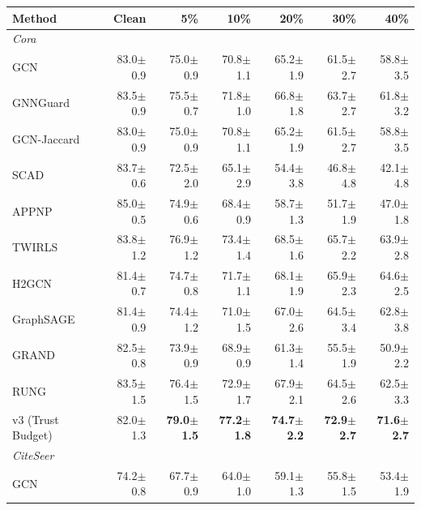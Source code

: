\documentclass{article}
\newcommand{\score}[2]{#1{\scriptsize$\pm$#2}}
\begin{document}
\begin{center}\scriptsize\begin{tabular}{lrrrrrr}
\toprule
Method & Clean & 5\% & 10\% & 20\% & 30\% & 40\% \\
\midrule
\multicolumn{7}{l}{\textit{Cora}} \\
\midrule
GCN            & \score{83.0}{0.9} & \score{75.0}{0.9} & \score{70.8}{1.1} & \score{65.2}{1.9} & \score{61.5}{2.7} & \score{58.8}{3.5} \\
GNNGuard       & \score{83.5}{0.9} & \score{75.5}{0.7} & \score{71.8}{1.0} & \score{66.8}{1.8} & \score{63.7}{2.7} & \score{61.8}{3.2} \\
GCN-Jaccard    & \score{83.0}{0.9} & \score{75.0}{0.9} & \score{70.8}{1.1} & \score{65.2}{1.9} & \score{61.5}{2.7} & \score{58.8}{3.5} \\
SCAD           & \score{83.7}{0.6} & \score{72.5}{2.0} & \score{65.1}{2.9} & \score{54.4}{3.8} & \score{46.8}{4.8} & \score{42.1}{4.8} \\
APPNP          & \score{85.0}{0.5} & \score{74.9}{0.6} & \score{68.4}{0.9} & \score{58.7}{1.3} & \score{51.7}{1.9} & \score{47.0}{1.8} \\
TWIRLS         & \score{83.8}{1.2} & \score{76.9}{1.2} & \score{73.4}{1.4} & \score{68.5}{1.6} & \score{65.7}{2.2} & \score{63.9}{2.8} \\
H2GCN          & \score{81.4}{0.7} & \score{74.7}{0.8} & \score{71.7}{1.1} & \score{68.1}{1.9} & \score{65.9}{2.3} & \score{64.6}{2.5} \\
GraphSAGE      & \score{81.4}{0.9} & \score{74.4}{1.2} & \score{71.0}{1.5} & \score{67.0}{2.6} & \score{64.5}{3.4} & \score{62.8}{3.8} \\
GRAND          & \score{82.5}{0.8} & \score{73.9}{0.9} & \score{68.9}{0.9} & \score{61.3}{1.4} & \score{55.5}{1.9} & \score{50.9}{2.2} \\
RUNG           & \score{83.5}{1.5} & \score{76.4}{1.5} & \score{72.9}{1.7} & \score{67.9}{2.1} & \score{64.5}{2.6} & \score{62.5}{3.3} \\
v3 (Trust Budget) & \score{82.0}{1.3} & \textbf{\score{79.0}{1.5}} & \textbf{\score{77.2}{1.8}} & \textbf{\score{74.7}{2.2}} & \textbf{\score{72.9}{2.7}} & \textbf{\score{71.6}{2.7}} \\
\midrule
\multicolumn{7}{l}{\textit{CiteSeer}} \\
\midrule
GCN            & \score{74.2}{0.8} & \score{67.7}{0.9} & \score{64.0}{1.0} & \score{59.1}{1.3} & \score{55.8}{1.5} & \score{53.4}{1.9} \\

\end{tabular}
\end{center}
\end{document}
